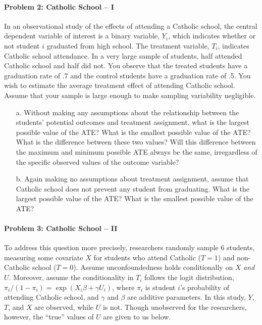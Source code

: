 \documentclass{article}
\begin{document}



\paragraph{Problem 2: Catholic School -- I}  In an observational study of the effects of
attending a Catholic school, the central dependent variable of
interest is a binary variable, $Y_i$, which indicates whether or not
student $i$ graduated from high school. The treatment variable, $T_i$,
indicates Catholic school attendance. In a very large sample of
students, half attended Catholic school and half did not. You observe
that the treated students have a graduation rate of .7 and the control
students have a graduation rate of .5. You wish to estimate the
average treatment effect of attending Catholic school. Assume that
your sample is large enough to make sampling variability negligible.

\begin{itemize}
\item[a.] Without making any assumptions about the relationship
  between the students’ potential outcomes and treatment assignment,
  what is the largest possible value of the ATE? What is the smallest
  possible value of the ATE? What is the difference between these two
  values? Will this difference between the maximum and minimum
  possible ATE always be the same, irregardless of the specific
  observed values of the outcome variable?
\item[b.] Again making no assumptions about treatment assignment,
  assume that Catholic school does not prevent any student from
  graduating. What is the largest possible value of the ATE? What is
  the smallest possible value of the ATE?
\end{itemize}

\paragraph{Problem 3: Catholic School -- II}

To address this question more precisely, researchers randomly sample 6
students, measuring some covariate $X$ for students who attend
Catholic ($T=1$) and non-Catholic school ($T=0$).  Assume
unconfoundedness holds conditionally on $X$ {\em and} $U$.
Moreover, assume the conditionality in $T_i$ follows the logit
distribution, $\pi_i/(1-\pi_i) = \exp(X_i\beta+\gamma U_i)$, where
$\pi_i$ is student $i$'s probability of attending Catholic school, and
$\gamma$ and $\beta$ are additive parameters.  
In this study, $Y$, $T$, and $X$ are observed, while $U$ is not.
Though unobserved for the researchers, however, the ``true'' values of
$U$ are given to us below.
\end{document}
